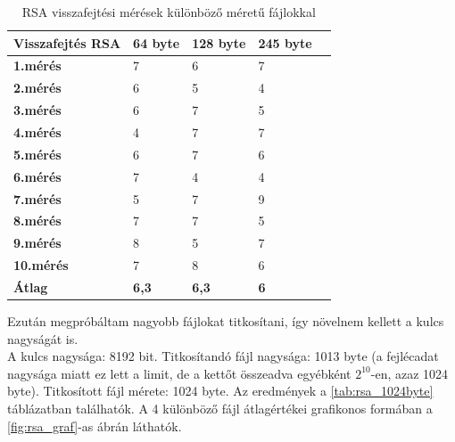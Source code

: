 \begin{table}[H]
	\centering
	\caption{RSA visszafejtési mérések különböző méretű fájlokkal}
	\label{tab:dec_rsa}
	\medskip
	\begin{tabular}{|p{2.4cm}|p{2cm}|p{2cm}|p{2cm}|p{2cm}|}
		\hline
		\textbf{Visszafejtés} \newline \textbf{RSA} & \textbf{64 byte} & \textbf{128 byte} & \textbf{245 byte}\\
		\hline
		\textbf{1.mérés} & 7 & 6 & 7\\
		\hline
		\textbf{2.mérés} & 6 & 5 & 4\\
		\hline
		\textbf{3.mérés} & 6 & 7 & 5\\
		\hline
		\textbf{4.mérés} & 4 & 7 & 7\\
		\hline
		\textbf{5.mérés} & 6 & 7 & 6\\
		\hline
		\textbf{6.mérés} & 7 & 4 & 4\\
		\hline
		\textbf{7.mérés} & 5 & 7 & 9\\
		\hline
		\textbf{8.mérés} & 7 & 7 & 5\\
		\hline
		\textbf{9.mérés} & 8 & 5 & 7\\
		\hline
		\textbf{10.mérés} & 7 & 8 & 6\\
		\hline
		\hline
		\textbf{Átlag} & \textbf{6,3} & \textbf{6,3} & \textbf{6}\\
		\hline
	\end{tabular}
\end{table}

\noindent Ezután megpróbáltam nagyobb fájlokat titkosítani, így növelnem kellett a kulcs nagyságát is.
\vspace{5pt} \\ A kulcs nagysága: 8192 bit. Titkosítandó fájl nagysága: 1013 byte (a fejlécadat nagysága miatt ez lett a limit, de a kettőt összeadva egyébként $2^{10}$-en, azaz 1024 byte). Titkosított fájl mérete: 1024 byte. Az eredmények a \ref{tab:rsa_1024byte} táblázatban találhatók. A 4 különböző fájl átlagértékei grafikonos formában a \ref{fig:rsa_graf}-as ábrán láthatók.


